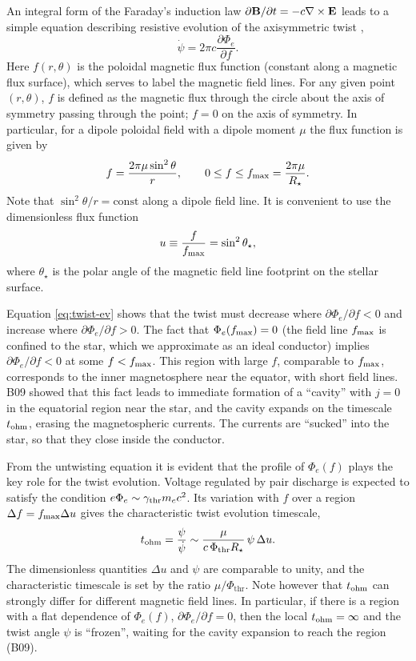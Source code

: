 An integral form of the Faraday's induction law $\partial {\mathbf B}/\partial t=-c\nabla\times{\mathbf E}$
leads to a simple equation describing
resistive evolution of the
axisymmetric twist
\citep{beloborodov_activated_2011},
\begin{equation}
  \label{eq:twist-ev}
  \dot{\psi} = 2\pi c \frac{\partial\Phi_{e}}{\partial f}.
\end{equation}
Here $f(r,\theta)$ is the poloidal magnetic flux function (constant along a magnetic flux
surface), which serves to label the magnetic field lines. For any given point $(r,\theta)$,
$f$ is defined as the magnetic flux through the circle about the axis of symmetry
passing through the point; $f = 0$ on the axis of symmetry.
In particular, for a dipole poloidal field with a dipole moment $\mu$ the flux
function is given by
\begin{equation}
  f = \frac{2\pi\mu \sin^2\theta}{r}, \qquad 0\leq f \leq f_{\max}=\frac{2\pi\mu}{R_\star}.
\end{equation}
Note that $\sin^2\theta/r=\mathrm{const}$ along a dipole field line. It is convenient to use the
dimensionless flux function
\begin{equation}
\label{eq:u}
  u\equiv\frac{f}{f_{\max}}=\sin^2\theta_\star,
\end{equation}
 where $\theta_\star$ is the polar angle of the magnetic field line footprint on the stellar
surface.

Equation \eqref{eq:twist-ev} shows that the twist must decrease where
$\partial\Phi_{e}/\partial f < 0$ and increase where $\partial\Phi_{e}/\partial
f > 0$. The fact that $\Phi_e(f_{\max})=0$ (the field line $f_{\max}$ is confined to
the star, which we approximate as an ideal conductor) implies
$\partial\Phi_e/\partial f<0$ at some $f<f_{\max}$. This region with large $f$,
comparable to $f_{\max}$, corresponds to the inner magnetosphere near the equator,
with short field lines. B09 showed that this fact leads to immediate formation
of a ``cavity'' with $j=0$ in the equatorial region near the star, and the
cavity expands on the timescale $t_{\rm ohm}$, erasing the magnetospheric currents. The
currents are ``sucked'' into the star, so that they close inside the conductor.

From the untwisting equation it is evident that the profile of $\Phi_e(f)$ plays the
key role for the twist evolution. Voltage regulated by pair discharge is expected to
satisfy the condition $e\Phi_e\sim \gamma_{\rm thr} m_ec^2$.
Its variation with $f$ over a region $\Delta f=f_{\max} \Delta u$ gives the characteristic
twist evolution timescale,
\begin{equation}
  \label{eq:tev}
  t_{\rm ohm}=\frac{\psi}{\dot{\psi}} \sim
  \frac{\mu}{c\,\Phi_\mathrm{thr}R_\star}\,\psi\,\Delta u.
\end{equation}
The dimensionless quantities $\Delta u$ and $\psi$ are comparable to unity,
and the characteristic timescale is set by the ratio $\mu /\Phi_\mathrm{thr}$.
Note however that $t_{\rm ohm}$ can strongly differ for different magnetic field lines.
In particular, if there is a region with a flat dependence of $\Phi_e(f)$,
$\partial\Phi_e/\partial f=0$,
then the local $t_{\rm ohm}=\infty$ and the twist angle $\psi$ is ``frozen'', waiting for the cavity
expansion to reach the region (B09).

